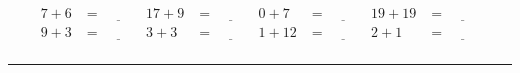 \documentclass{article}
\begin{document}
\begin{sloppy}
\begin{align*}
    {7} + {6} &= \underline{\hspace{1cm}} & {17} + {9} &= \underline{\hspace{1cm}} & {0} + {7} &= \underline{\hspace{1cm}} & {19} + {19} &= \underline{\hspace{1cm}} \\
    {9} + {3} &= \underline{\hspace{1cm}} & {3} + {3} &= \underline{\hspace{1cm}} & {1} + {12} &= \underline{\hspace{1cm}} & {2} + {1} &= \underline{\hspace{1cm}} \\
\end{align*}
\hrule
\end{sloppy}
\end{document}
